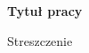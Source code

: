 \documentclass[../thesis.tex]{subfiles}
\begin{document}
\def\abstract{
\vfil
\begin{center}%
{\bfseries {\Large \abstractname}}%
\end{center}
\quotation
}
   
\def\endabstract{\par
\endquotation
}
\thispagestyle{empty}

\begin{abstract}
\begin{center}
{\bfseries Tytuł pracy}\\[0.3cm]
\end{center}
	
Streszczenie	
	
\end{abstract}

\newpage	
\thispagestyle{empty}
\cleardoublepage 
\end{document}
